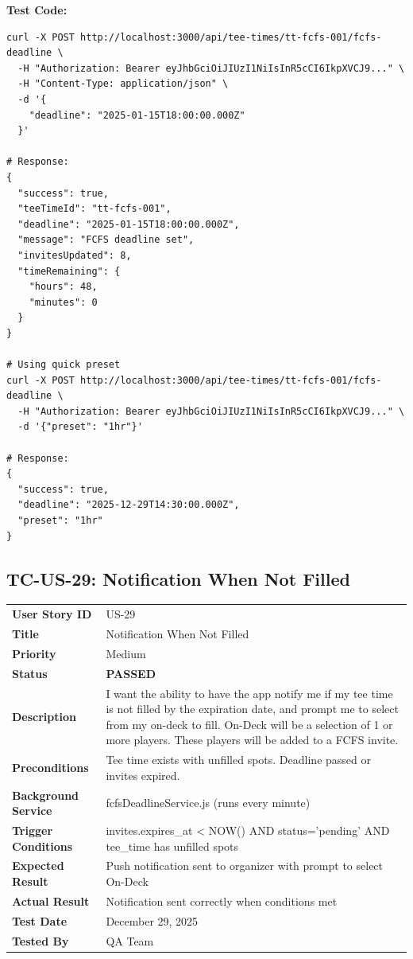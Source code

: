 \documentclass[11pt,a4paper]{article}
\newcommand{\passed}{\textcolor{pass}{\textbf{PASSED}}}
\begin{document}
\vspace{0.3cm}
\textbf{Test Code:}
\begin{lstlisting}
curl -X POST http://localhost:3000/api/tee-times/tt-fcfs-001/fcfs-deadline \
  -H "Authorization: Bearer eyJhbGciOiJIUzI1NiIsInR5cCI6IkpXVCJ9..." \
  -H "Content-Type: application/json" \
  -d '{
    "deadline": "2025-01-15T18:00:00.000Z"
  }'

# Response:
{
  "success": true,
  "teeTimeId": "tt-fcfs-001",
  "deadline": "2025-01-15T18:00:00.000Z",
  "message": "FCFS deadline set",
  "invitesUpdated": 8,
  "timeRemaining": {
    "hours": 48,
    "minutes": 0
  }
}

# Using quick preset
curl -X POST http://localhost:3000/api/tee-times/tt-fcfs-001/fcfs-deadline \
  -H "Authorization: Bearer eyJhbGciOiJIUzI1NiIsInR5cCI6IkpXVCJ9..." \
  -d '{"preset": "1hr"}'

# Response:
{
  "success": true,
  "deadline": "2025-12-29T14:30:00.000Z",
  "preset": "1hr"
}
\end{lstlisting}

\vspace{0.5cm}


\subsection{TC-US-29: Notification When Not Filled}

\begin{tabularx}{\textwidth}{|p{3.2cm}|Y|}
\hline
{}
\multicolumn{2}{|l|}{\textbf{TEST CASE: TC-US-29}} \\
\hline
\textbf{User Story ID} & US-29 \\
\hline
\textbf{Title} & Notification When Not Filled \\
\hline
\textbf{Priority} & Medium \\
\hline
\textbf{Status} & \passed \\
\hline
\textbf{Description} & I want the ability to have the app notify me if my tee time is not filled by the expiration date, and prompt me to select from my on-deck to fill. On-Deck will be a selection of 1 or more players. These players will be added to a FCFS invite. \\
\hline
\textbf{Preconditions} & Tee time exists with unfilled spots. Deadline passed or invites expired. \\
\hline
\textbf{Background Service} & fcfsDeadlineService.js (runs every minute) \\
\hline
\textbf{Trigger Conditions} & invites.expires\_at < NOW() AND status='pending' AND tee\_time has unfilled spots \\
\hline
\textbf{Expected Result} & Push notification sent to organizer with prompt to select On-Deck \\
\hline
\textbf{Actual Result} & Notification sent correctly when conditions met \\
\hline
\textbf{Test Date} & December 29, 2025 \\
\hline
\textbf{Tested By} & QA Team \\
\hline
\end{tabularx}
\end{document}
